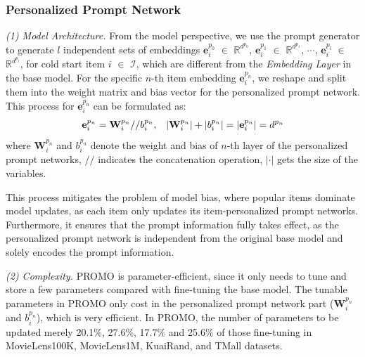 \documentclass[sigconf]{acmart}
\newcommand{\sys}{\textsc{PROMO}\xspace}
\begin{document}
\subsubsection{Personalized Prompt Network}
\textit{(1) Model Architecture.} From the model perspective, we use the prompt generator to generate $l$ independent sets of embeddings $\mathbf{e}_i^{p_0}$ $\in$ $\mathbb{R}^{d^{p_0}}$, $\mathbf{e}_i^{p_1}$ $\in$ $\mathbb{R}^{d^{p_1}}$, $\cdots$, $\mathbf{e}_i^{p_l}$ $\in$ $\mathbb{R}^{d^{p_l}}$, for cold start item $i$ $\in$ $\mathcal{I}$, which are different from the \textit{Embedding Layer} in the base model. 
For the specific $n$-th item embedding $\mathbf{e}_i^{p_n}$, we reshape and split them into the weight matrix and bias vector for the personalized prompt network. 
This process for $\mathbf{e}_i^{p_n}$ can be formulated as:
\begin{equation}
\begin{aligned} \small
&\mathbf{e}_i^{p_n} = \mathbf{W}_i^{p_n} // b_i^{p_n}, 
&\left|\mathbf{W}_i^{p_n}\right| + \left|b_i^{p_n}\right| = \left|\mathbf{e}_i^{p_n}\right| = d^{p_n}
\end{aligned}
\end{equation}
where $\mathbf{W}_i^{p_n}$ and $b_i^{p_n}$ denote the weight and bias of $n$-th layer of the personalized prompt networks, $//$ indicates the concatenation operation, $\left| \cdot \right|$ gets the size of the variables.

This process mitigates the problem of model bias, where popular items dominate model updates, as each item only updates its item-personalized prompt networks. 
Furthermore, it ensures that the prompt information fully takes effect, as the personalized prompt network is independent from the original base model and solely encodes the prompt information.

\textit{(2) Complexity.} \sys is parameter-efficient, since it only needs to tune and store a few parameters compared with fine-tuning the base model. 
The tunable parameters in \sys only cost in the personalized prompt network part ($\mathbf{W}_i^{p_n}$ and $b_i^{p_n}$), which is very efficient. 
In \sys, the number of parameters to be updated merely 20.1\%, 27.6\%, 17.7\% and 25.6\% of those fine-tuning in MovieLens100K, MovieLens1M, KuaiRand, and TMall datasets. 
\end{document}
